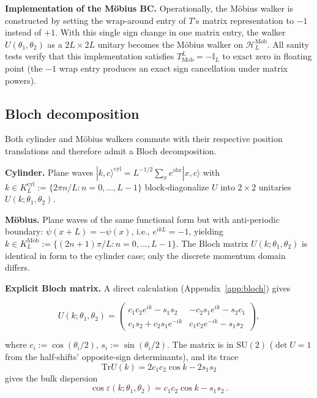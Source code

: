 \documentclass[aps,pra,reprint,amsmath,amssymb,superscriptaddress,nofootinbib,longbibliography]{revtex4-2}
\newcommand{\I}{\mathbb{I}}
\newcommand{\ket}[1]{| #1 \rangle}
\newcommand{\Mob}{\mathrm{M\ddot{o}b}}
\newcommand{\cyl}{\mathrm{cyl}}
\newcommand{\Tr}{\mathrm{Tr}}
\begin{document}
\textbf{Implementation of the M\"obius BC.} Operationally, the M\"obius walker is constructed by setting the wrap-around entry of $T$'s matrix representation to $-1$ instead of $+1$. With this single sign change in one matrix entry, the walker $U(\theta_1, \theta_2)$ as a $2L \times 2L$ unitary becomes the M\"obius walker on $\mathcal{H}_L^\Mob$. All sanity tests verify that this implementation satisfies $T_\Mob^L = -\I_L$ to exact zero in floating point (the $-1$ wrap entry produces an exact sign cancellation under matrix powers).

\subsection{Bloch decomposition}
\label{sec:bloch}

Both cylinder and M\"obius walkers commute with their respective position translations and therefore admit a Bloch decomposition.

\textbf{Cylinder.} Plane waves $\ket{k, c}^\cyl = L^{-1/2}\sum_x e^{ikx}\ket{x, c}$ with $k \in K_L^\cyl := \{2\pi n / L : n = 0, \dots, L-1\}$ block-diagonalize $U$ into $2 \times 2$ unitaries $U(k; \theta_1, \theta_2)$.

\textbf{M\"obius.} Plane waves of the same functional form but with anti-periodic boundary: $\psi(x+L) = -\psi(x)$, i.e., $e^{ikL} = -1$, yielding $k \in K_L^\Mob := \{(2n+1)\pi/L : n = 0, \dots, L-1\}$. The Bloch matrix $U(k; \theta_1, \theta_2)$ is identical in form to the cylinder case; only the discrete momentum domain differs.

\textbf{Explicit Bloch matrix.} A direct calculation (Appendix~\ref{app:bloch}) gives
\begin{widetext}
\begin{equation}
U(k; \theta_1, \theta_2) = \begin{pmatrix}
c_1 c_2 e^{ik} - s_1 s_2 & -c_2 s_1 e^{ik} - s_2 c_1 \\
c_1 s_2 + c_2 s_1 e^{-ik} & c_1 c_2 e^{-ik} - s_1 s_2
\end{pmatrix},
\label{eq:U_k_matrix}
\end{equation}
\end{widetext}
where $c_i := \cos(\theta_i/2)$, $s_i := \sin(\theta_i/2)$. The matrix is in $\mathrm{SU}(2)$ ($\det U = 1$ from the half-shifts' opposite-sign determinants), and its trace
\begin{equation}
\Tr U(k) = 2 c_1 c_2 \cos k - 2 s_1 s_2
\end{equation}
gives the bulk dispersion
\begin{equation}
\boxed{
\cos\varepsilon(k; \theta_1, \theta_2) = c_1 c_2 \cos k - s_1 s_2\, .
}
\label{eq:dispersion}
\end{equation}
\end{document}
